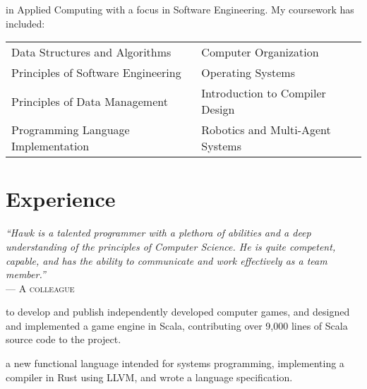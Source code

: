 \documentclass[a4paper]{tufte-handout}
\begin{document}
 in Applied Computing with a focus in Software Engineering. My coursework has included: \\
    {\footnotesize
    \begin{tabular}{l l}
    Data Structures and Algorithms  & Computer Organization \\
    Principles of Software Engineering & Operating Systems\\
    Principles of Data Management & Introduction to Compiler Design\\
    Programming Language Implementation & Robotics and Multi-Agent Systems\\
\end{tabular} }

\section{Experience}
    {\begingroup\footnotesize
    \emph{``Hawk is a talented programmer with a plethora of abilities and a deep understanding of the principles of Computer Science. He is quite competent, capable, and has the ability to communicate and work effectively as a team member.''}\\
    --- \textsc{A colleague}\endgroup}

 to develop and publish independently developed computer games, and designed and implemented a game engine in Scala, contributing over 9,000 lines of Scala source code to the project.

 a new functional language intended for systems programming, implementing a compiler in Rust using LLVM, and wrote a language specification.
\end{document}
